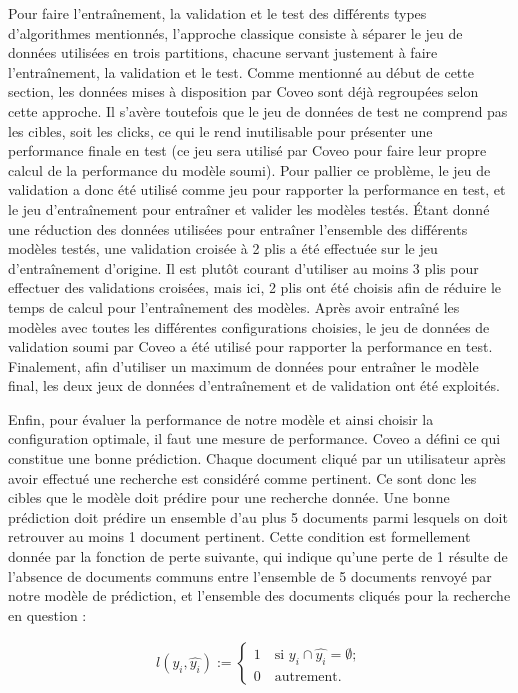 Pour faire l'entraînement, la validation et le test des différents types d'algorithmes mentionnés, l'approche classique consiste à séparer le jeu de données utilisées en trois partitions, chacune servant justement à faire l'entraînement, la validation et le test. Comme mentionné au début de cette section, les données mises à disposition par Coveo sont déjà regroupées selon cette approche. Il s'avère toutefois que le jeu de données de test ne comprend pas les cibles, soit les clicks, ce qui le rend inutilisable pour présenter une performance finale en test (ce jeu sera utilisé par Coveo pour faire leur propre calcul de la performance du modèle soumi). Pour pallier ce problème, le jeu de validation a donc été utilisé comme jeu pour rapporter la performance en test, et le jeu d'entraînement pour entraîner et valider les modèles testés. Étant donné une réduction des données utilisées pour entraîner l'ensemble des différents modèles testés, une validation croisée à 2 plis a été effectuée sur le jeu d'entraînement d'origine. Il est plutôt courant d'utiliser au moins 3 plis pour effectuer des validations croisées, mais ici, 2 plis ont été choisis afin de réduire le temps de calcul pour l'entraînement des modèles. Après avoir entraîné les modèles avec toutes les différentes configurations choisies, le jeu de données de validation soumi par Coveo a été utilisé pour rapporter la performance en test. Finalement, afin d'utiliser un maximum de données pour entraîner le modèle final, les deux jeux de données d'entraînement et de validation ont été exploités.
\break

Enfin, pour évaluer la performance de notre modèle et ainsi choisir la configuration optimale, il faut une mesure de performance. Coveo a défini ce qui constitue une bonne prédiction. Chaque document cliqué par un utilisateur après avoir effectué une recherche est considéré comme pertinent. Ce sont donc les cibles que le modèle doit prédire pour une recherche donnée. Une bonne prédiction doit prédire un ensemble d'au plus 5 documents parmi lesquels on doit retrouver au moins 1 document pertinent. Cette condition est formellement donnée par la fonction de perte suivante, qui indique qu'une perte de 1 résulte de l'absence de documents communs entre l'ensemble de 5 documents renvoyé par notre modèle de prédiction, et l'ensemble des documents cliqués pour la recherche en question :

\begin{gather}
l(y_i, \widehat{y_i}):=\left\{
                          \begin{array}{ll}
                            1 \quad\text{si } y_i \cap \widehat{y_i}=\emptyset; \\
                            0 \quad\text{autrement}.
                          \end{array}
                        \right.
\end{gather}



